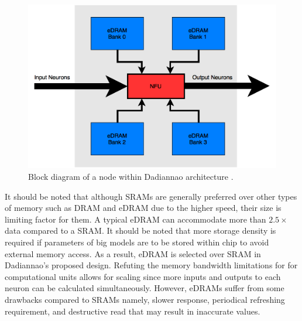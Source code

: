 \documentclass[runningheads,a4paper]{llncs}
\begin{document}
{\begin{figure}[h]
	\includegraphics[scale=0.3]{./images/dadiannao_node.png}
	\centering
	\caption{Block diagram of a node within Dadiannao architecture \cite{chen2014dadiannao}.}
	\label{fig:NFU_Diagram}
\end{figure}
It should be noted that although SRAMs are generally preferred over other types of memory such as DRAM and eDRAM due to the higher speed, their size is limiting factor for them. A typical eDRAM can accommodate more than $2.5\times$ data compared to a SRAM. It should be noted that more storage density is required if parameters of big models are to be stored within chip to avoid external memory access. As a result, eDRAM is selected over SRAM in Dadiannao's proposed design. Refuting the memory bandwidth limitations for for computational units allows for scaling since more inputs and outputs to each neuron can be calculated simultaneously. However, eDRAMs suffer from some drawbacks compared to SRAMs namely, slower response, periodical refreshing requirement, and destructive read that may result in inaccurate values.\\

}
\end{document}
